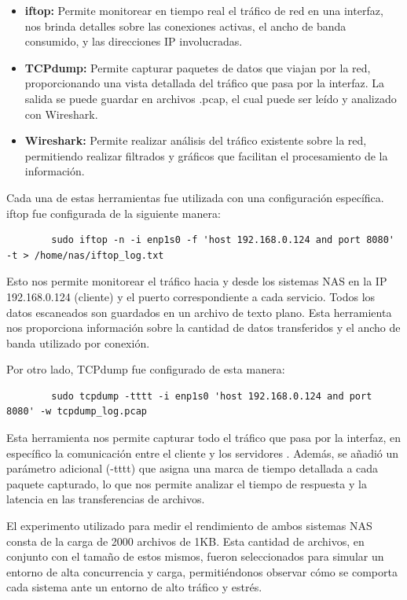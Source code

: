 \documentclass[a4paper,10pt]{article}
\begin{document}
	\begin{itemize}
		\item \textbf{iftop:} Permite monitorear en tiempo real el tráfico de red en una interfaz, nos brinda detalles sobre las conexiones activas, el ancho de banda consumido, y las direcciones IP involucradas.
		
		\item \textbf{TCPdump:} Permite capturar paquetes de datos que viajan por la red, proporcionando una vista detallada del tráfico que pasa por la interfaz. La salida se puede guardar en archivos .pcap, el cual puede ser leído y analizado con Wireshark.
		
		\item \textbf{Wireshark:} Permite realizar análisis del tráfico existente sobre la red, permitiendo realizar filtrados y gráficos que facilitan el procesamiento de la información.
	\end{itemize}
	
	Cada una de estas herramientas fue utilizada con una configuración específica. iftop fue configurada de la siguiente manera:
	
	\begin{verbatim}
		sudo iftop -n -i enp1s0 -f 'host 192.168.0.124 and port 8080' -t > /home/nas/iftop_log.txt
	\end{verbatim}
	
	Esto nos permite monitorear el tráfico hacia y desde los sistemas NAS en la IP 192.168.0.124 (cliente) y el puerto correspondiente a cada servicio. Todos los datos escaneados son guardados en un archivo de texto plano. Esta herramienta nos proporciona información sobre la cantidad de datos transferidos y el ancho de banda utilizado por conexión.
	
	Por otro lado, TCPdump fue configurado de esta manera:
		
	\begin{verbatim}
		sudo tcpdump -tttt -i enp1s0 'host 192.168.0.124 and port 8080' -w tcpdump_log.pcap
	\end{verbatim}
	
	Esta herramienta nos permite capturar todo el tráfico que pasa por la interfaz, en específico la comunicación entre el cliente y los servidores . Además, se añadió un parámetro adicional (-tttt) que asigna una marca de tiempo detallada a cada paquete capturado, lo que nos permite analizar el tiempo de respuesta y la latencia en las transferencias de archivos.
	
	El experimento utilizado para medir el rendimiento de ambos sistemas NAS consta de la carga de 2000 archivos de 1KB. Esta cantidad de archivos, en conjunto con el tamaño de estos mismos, fueron seleccionados para simular un entorno de alta concurrencia y carga, permitiéndonos observar cómo se comporta cada sistema ante un entorno de alto tráfico y estrés.
	
\end{document}

